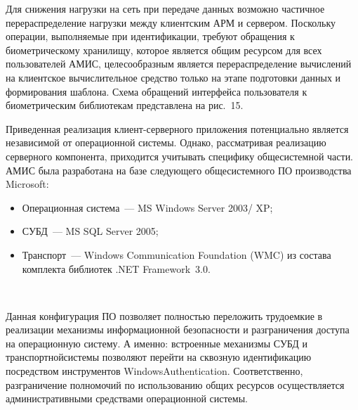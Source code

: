 \begin{multicols}{2}
  
  Для снижения нагрузки на сеть при передаче данных возможно частичное 
перераспределение нагрузки между клиентским АРМ и сервером. Поскольку 
операции, выполняемые при идентификации, требуют обращения к 
биометрическому хранилищу, которое является общим ресурсом для всех 
пользователей АМИС, целесообразным является перераспределение 
вычислений на клиентское вычислительное средство только на этапе 
подготовки данных и формирования шаблона. Схема обращений интерфейса 
пользователя к биометрическим библиотекам представлена на 
рис.~15.

 
  Приведенная реализация клиент-серверного приложения потенциально 
является независимой от операционной системы. Однако, рассматривая 
реализацию серверного компонента, приходится учитывать специфику 
общесистемной части. АМИС была разработана на базе следующего 
общесистемного ПО производства Microsoft:
  \begin{itemize}
  \item Операционная система~--- MS Windows Server 2003/ XP; 
  \item СУБД~--- MS SQL Server 2005;
\item Транспорт~--- Windows Communication Foundation (WMC) из 
состава комплекта библиотек .NET Framework~3.0.
  \end{itemize}
  

  \begin{figure*} %
\vspace*{1pt}
\begin{center}
\mbox{%
\epsfxsize=165.842mm  
 }
\end{center}
\vspace*{-6pt}
  \vspace*{6pt}
  \end{figure*}

  
  Данная конфигурация ПО позволяет пол\-ностью переложить трудоемкие в 
реализации механизмы информационной безопасности и разграничения 
доступа на операционную сис\-те\-му. А именно: встро\-ен\-ные механизмы СУБД и 
транспортной\linebreak сис\-те\-мы позволяют перейти на сквозную идентификацию 
посредством инструментов Windows\linebreak Au\-thenti\-cation. Соответственно, 
разграничение полномочий по использованию общих ресурсов осуществляется 
административными средствами операционной системы.  
{ %

}
\end{multicols}

